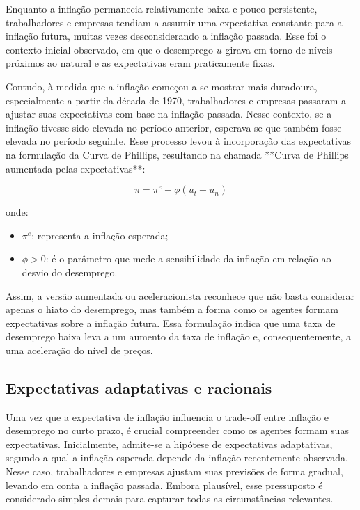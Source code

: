 \documentclass[12pt,oneside]{abntex2}
\begin{document}
Enquanto a inflação permanecia relativamente baixa e pouco persistente, trabalhadores e empresas tendiam a assumir uma expectativa constante para a inflação futura, muitas vezes desconsiderando a inflação passada. Esse foi o contexto inicial observado, em que o desemprego $u$ girava em torno de níveis próximos ao natural e as expectativas eram praticamente fixas.  

Contudo, à medida que a inflação começou a se mostrar mais duradoura, especialmente a partir da década de 1970, trabalhadores e empresas passaram a ajustar suas expectativas com base na inflação passada. Nesse contexto, se a inflação tivesse sido elevada no período anterior, esperava-se que também fosse elevada no período seguinte. Esse processo levou à incorporação das expectativas na formulação da Curva de Phillips, resultando na chamada **Curva de Phillips aumentada pelas expectativas**:

\[
\pi = \pi^e - \phi (u_t - u_n)
\]

onde:
\begin{itemize}
    \item $\pi^e$: representa a inflação esperada;
    \item $\phi > 0$: é o parâmetro que mede a sensibilidade da inflação em relação ao desvio do desemprego.
\end{itemize}

Assim, a versão aumentada ou aceleracionista reconhece que não basta considerar apenas o hiato do desemprego, mas também a forma como os agentes formam expectativas sobre a inflação futura. Essa formulação indica que uma taxa de desemprego baixa leva a um aumento da taxa de inflação e, consequentemente, a uma aceleração do nível de preços. 

\subsection*{\textbf{Expectativas adaptativas e racionais}}

Uma vez que a expectativa de inflação influencia o trade-off entre inflação e desemprego no curto prazo, é crucial compreender como os agentes formam suas expectativas. Inicialmente, admite-se a hipótese de expectativas adaptativas, segundo a qual a inflação esperada depende da inflação recentemente observada. Nesse caso, trabalhadores e empresas ajustam suas previsões de forma gradual, levando em conta a inflação passada. Embora plausível, esse pressuposto é considerado simples demais para capturar todas as circunstâncias relevantes.
\end{document}
